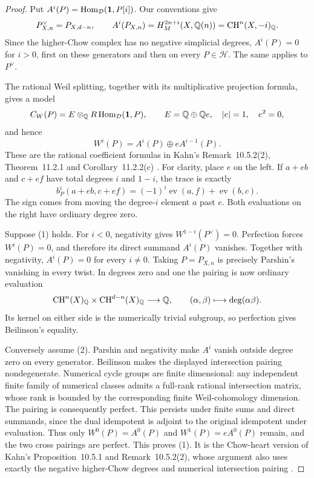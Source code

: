 \begin{proof}
Put \(A^i(P)=\operatorname{Hom}_{\mathcal D}(\mathbf1,P[i])\).  Our conventions give
\[
 P_{X,n}^\vee=P_{X,d-n},\qquad
 A^i(P_{X,n})=H_M^{2n+i}(X,\mathbb Q(n))
             =\operatorname{CH}^n(X,-i)_\mathbb Q.
\]
Since the higher-Chow complex has no negative simplicial degrees,
\(A^i(P)=0\) for \(i>0\), first on these generators and then on every
\(P\in\mathcal H\).  The same applies to \(P^\vee\).

The rational Weil splitting, together with its multiplicative
projection formula, gives a model
\[
 C_W(P)=E\otimes_\mathbb Q R\operatorname{Hom}_{\mathcal D}(\mathbf1,P),\qquad
 E=\mathbb Q\oplus\mathbb Q e,\quad |e|=1,\quad e^2=0,
\]
and hence
\[
 W^i(P)=A^i(P)\oplus e A^{i-1}(P).
\]
These are the rational coefficient formulas in Kahn's
Remark~10.5.2(2), Theorem~11.2.1 and Corollary~11.2.2(c)
\cite[pp.~47--49]{BKahn2012FullFaithfulness}.  For clarity, place
\(e\) on the left.  If \(a+eb\) and \(c+ef\) have total degrees
\(i\) and \(1-i\), the trace is exactly
\[
 b_P^i(a+eb,c+ef)=(-1)^i\operatorname{ev}(a,f)
                         +\operatorname{ev}(b,c).
\]
The sign comes from moving the degree-\(i\) element \(a\) past \(e\).
Both evaluations on the right have ordinary degree zero.

Suppose (1) holds.  For \(i<0\), negativity gives
\(W^{1-i}(P^\vee)=0\).  Perfection forces \(W^i(P)=0\), and therefore
its direct summand \(A^i(P)\) vanishes.  Together with negativity,
\(A^i(P)=0\) for every \(i\ne0\).  Taking \(P=P_{X,n}\) is precisely
Parshin's vanishing in every twist.  In degrees zero and one the
pairing is now ordinary evaluation
\[
 \operatorname{CH}^n(X)_\mathbb Q\times
 \operatorname{CH}^{d-n}(X)_\mathbb Q
 \longrightarrow\mathbb Q,\qquad
 (\alpha,\beta)\longmapsto\deg(\alpha\beta).
\]
Its kernel on either side is the numerically trivial subgroup, so
perfection gives Beilinson's equality.

Conversely assume (2).  Parshin and negativity make \(A^i\) vanish
outside degree zero on every generator.  Beilinson makes the displayed
intersection pairing nondegenerate.  Numerical cycle groups are
finite dimensional: any independent finite family of numerical classes
admits a full-rank rational intersection matrix, whose rank is bounded
by the corresponding finite Weil-cohomology dimension.  The pairing
is consequently perfect.  This persists under finite sums and direct
summands, since the dual idempotent is adjoint to the original
idempotent under evaluation.  Thus only
\(W^0(P)=A^0(P)\) and \(W^1(P)=eA^0(P)\) remain, and the two cross
pairings are perfect.  This proves (1).  It is the Chow-heart version
of Kahn's Proposition~10.5.1 and Remark~10.5.2(2), whose argument
also uses exactly the negative higher-Chow degrees and numerical
intersection pairing \cite[pp.~46--47]{BKahn2012FullFaithfulness}.


\end{proof}
